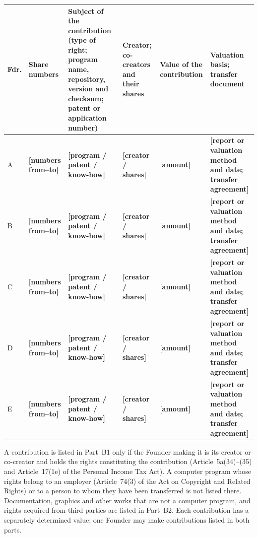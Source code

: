 \documentclass[12pt,a4paper]{report}
\newcommand{\field}[1]{\textbf{[#1]}}
\begin{document}
\begin{center}
\begin{tabularx}{\linewidth}{@{}p{0.9cm} p{2.0cm} >{\raggedright\arraybackslash}X >{\raggedright\arraybackslash}p{2.3cm} >{\raggedright\arraybackslash}p{1.85cm} >{\raggedright\arraybackslash}p{2.5cm}@{}}
\toprule
\textbf{Fdr.} & \textbf{Share numbers} & \textbf{Subject of the contribution (type of right; program name, repository, version and checksum; patent or application number)} & \textbf{Creator; co-creators and their shares} & \textbf{Value of the contri\-bution} & \textbf{Valuation basis; transfer document} \\
\midrule
A & \field{numbers from--to} & \field{program / patent / know-how} & \field{creator / shares} & \field{amount} & \field{report or valuation method and date; transfer agreement} \\
B & \field{numbers from--to} & \field{program / patent / know-how} & \field{creator / shares} & \field{amount} & \field{report or valuation method and date; transfer agreement} \\
C & \field{numbers from--to} & \field{program / patent / know-how} & \field{creator / shares} & \field{amount} & \field{report or valuation method and date; transfer agreement} \\
D & \field{numbers from--to} & \field{program / patent / know-how} & \field{creator / shares} & \field{amount} & \field{report or valuation method and date; transfer agreement} \\
E & \field{numbers from--to} & \field{program / patent / know-how} & \field{creator / shares} & \field{amount} & \field{report or valuation method and date; transfer agreement} \\
\bottomrule
\end{tabularx}
\end{center}

A contribution is listed in Part~B1 only if the Founder making it is its creator or co-creator and holds the rights constituting the contribution (Article~5a(34)--(35) and Article~17(1e) of the Personal Income Tax Act). A computer program whose rights belong to an employer (Article~74(3) of the Act on Copyright and Related Rights) or to a person to whom they have been transferred is not listed there. Documentation, graphics and other works that are not a computer program, and rights acquired from third parties are listed in Part~B2. Each contribution has a separately determined value; one Founder may make contributions listed in both parts.
\end{document}
